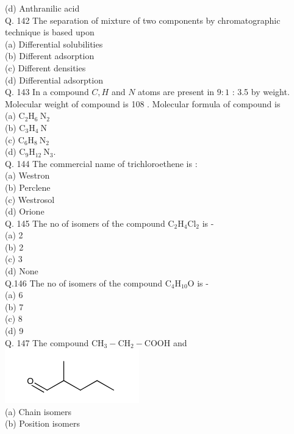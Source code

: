 \documentclass[10pt]{article}
\begin{document}
(d) Anthranilic acid\\
Q. 142 The separation of mixture of two components by chromatographic technique is based upon\\
(a) Differential solubilities\\
(b) Different adsorption\\
(c) Different densities\\
(d) Differential adsorption\\
Q. 143 In a compound $C, H$ and $N$ atoms are present in $9: 1$ : 3.5 by weight. Molecular weight of compound is 108 . Molecular formula of compound is\\
(a) $\mathrm{C}_{2} \mathrm{H}_{6} \mathrm{~N}_{2}$\\
(b) $\mathrm{C}_{3} \mathrm{H}_{4} \mathrm{~N}$\\
(c) $\mathrm{C}_{6} \mathrm{H}_{8} \mathrm{~N}_{2}$\\
(d) $\mathrm{C}_{9} \mathrm{H}_{12} \mathrm{~N}_{3}$.\\
Q. 144 The commercial name of trichloroethene is :\\
(a) Westron\\
(b) Perclene\\
(c) Westrosol\\
(d) Orione\\
Q. 145 The no of isomers of the compound $\mathrm{C}_{2} \mathrm{H}_{4} \mathrm{Cl}_{2}$ is -\\
(a) 2\\
(b) 2\\
(c) 3\\
(d) None\\
Q.146 The no of isomers of the compound $\mathrm{C}_{4} \mathrm{H}_{10} \mathrm{O}$ is -\\
(a) 6\\
(b) 7\\
(c) 8\\
(d) 9\\
Q. 147 The compound $\mathrm{CH}_{3}-\mathrm{CH}_{2}-\mathrm{COOH}$ and\\
\includegraphics{smile-821ef1480bf98eb1040cf27e9be05db37345ca82}\\
(a) Chain isomers\\
(b) Position isomers\\
\end{document}
